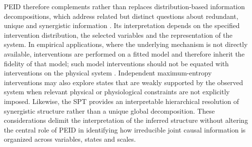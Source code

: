 \documentclass[fleqn,10pt]{wlscirep}
\theoremstyle{naturetheorem}
\begin{document}
PEID therefore complements rather than replaces distribution-based information decompositions, which address related but distinct questions about redundant, unique and synergistic information \cite{Williams2010NonnegativeDO,Mediano2025TowardAU,Lyu2026StructuralImpossibility}. Its interpretation depends on the specified intervention distribution, the selected variables and the representation of the system. In empirical applications, where the underlying mechanism is not directly available, interventions are performed on a fitted model and therefore inherit the fidelity of that model; such model interventions should not be equated with interventions on the physical system \cite{Pearl2009CausalII}. Independent maximum-entropy interventions may also explore states that are weakly supported by the observed system when relevant physical or physiological constraints are not explicitly imposed. Likewise, the SPT provides an interpretable hierarchical resolution of synergistic structure rather than a unique global decomposition. These considerations delimit the interpretation of the inferred structure without altering the central role of PEID in identifying how irreducible joint causal information is organized across variables, states and scales.
\end{document}
